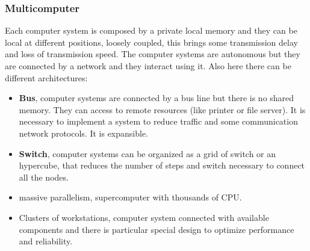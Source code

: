 \documentclass[11pt,a4paper]{article}
\begin{document}
\subsubsection{Multicomputer}
Each computer system is composed by a private local memory and they can be local at different positions, loosely coupled, this brings some transmission delay and loss of transmission speed. The computer systems are autonomous but they are connected by a network and they interact using it. Also here there can be different architectures:
\begin{itemize}
    \item \textbf{Bus}, computer systems are connected by a bus line but there is no shared memory. They can access to remote resources (like printer or file server). It is necessary to implement a system  to reduce traffic and some communication network protocols. It is expansible.
    \item \textbf{Switch}, computer systems can be organized as a grid of switch or an hypercube, that reduces the number of steps and switch necessary to connect all the nodes.
    \item massive parallelism, supercomputer with thousands of CPU.
    \item Clusters of workstations, computer system connected with available components and there is particular special design to optimize performance and reliability. 
\end{itemize}
\end{document}
